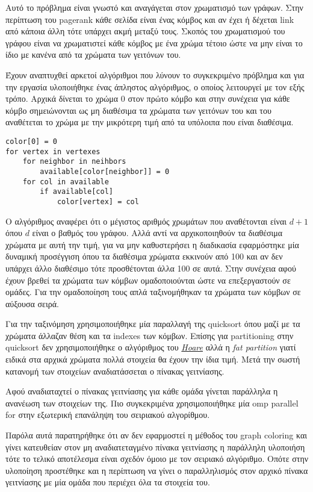 \documentclass[10p]{report}
\begin{document}
Αυτό το πρόβλημα είναι γνωστό και αναγάγεται στον χρωματισμό των γράφων. Στην
περίπτωση του pagerank κάθε σελίδα είναι ένας κόμβος και αν έχει ή δέχεται link
από κάποια άλλη τότε υπάρχει ακμή μεταξύ τους. Σκοπός του χρωματισμού του γράφου
είναι να χρωματιστεί κάθε κόμβος με ένα χρώμα τέτοιο ώστε να μην είναι το ίδιο
με κανένα από τα χρώματα των γειτόνων του. 

Έχουν αναπτυχθεί αρκετοί αλγόριθμοι που λύνουν το συγκεκριμένο πρόβλημα και για
την εργασία υλοποιήθηκε ένας άπληστος αλγόριθμος, ο οποίος λειτουργεί
με τον εξής τρόπο. Αρχικά δίνεται το χρώμα 0 στον πρώτο κόμβο και στην συνέχεια
για κάθε κόμβο σημειώνονται ως μη διαθέσιμα τα χρώματα των γειτόνων του και του
αναθέτεται το χρώμα με την μικρότερη τιμή από τα υπόλοιπα που είναι διαθέσιμα. 
\newpage
\begin{lstlisting}
color[0] = 0
for vertex in vertexes
    for neighbor in neihbors
        available[color[neighbor]] = 0
    for col in available
        if available[col]
            color[vertex] = col
\end{lstlisting}

Ο αλγόριθμος αναφέρει ότι ο μέγιστος αριθμός χρωμάτων που αναθέτονται είναι
$ d + 1 $ όπου $ d $ είναι ο βαθμός του γράφου. Αλλά αντί να αρχικοποιηθούν τα διαθέσιμα
χρώματα με αυτή την τιμή, για να μην καθυστερήσει η διαδικασία εφαρμόστηκε μία
δυναμική προσέγγιση όπου τα διαθέσιμα χρώματα εκκινούν από 100 και αν δεν
υπάρχει άλλο διαθέσιμο τότε προσθέτονται άλλα 100 σε αυτά.
Στην συνέχεια αφού έχουν βρεθεί τα χρώματα των κόμβων ομαδοποιούνται ώστε να
επεξεργαστούν σε ομάδες. Για την ομαδοποίηση τους απλά ταξινομήθηκαν τα χρώματα
των κόμβων σε αύξουσα σειρά.

Για την ταξινόμηση χρησιμοποιήθηκε μία παραλλαγή της quicksort όπου μαζί με τα
χρώματα άλλαζαν θέση και τα indexes των κόμβων. Επίσης για partitioning στην
quicksort δεν χρησιμοποιήθηκε ο αλγόριθμος του 
\href{https://en.wikipedia.org/wiki/Quicksort#Hoare_partition_scheme}{\textit{Hoare}}
αλλά η \textit{fat partition}
γιατί ειδικά στα αρχικά χρώματα πολλά στοιχεία θα έχουν την ίδια τιμή. Μετά την
σωστή κατανομή των στοιχείων αναδιατάσσεται ο πίνακας γειτνίασης. 

Αφού αναδιαταχτεί ο πίνακας γειτνίασης για κάθε ομάδα γίνεται παράλληλα η ανανέωση 
των στοιχείων της. Πιο συγκεκριμένα χρησιμοποιήθηκε μία omp parallel for στην εξωτερική 
επανάληψη του σειριακού αλγορίθμου.

Παρόλα αυτά παρατηρήθηκε ότι αν δεν εφαρμοστεί η μέθοδος του graph coloring και 
γίνει κατευθείαν στον μη αναδιατεταγμένο πίνακα γειτνίασης η παράλληλη υλοποιήση
τότε το τελικό αποτέλεσμα είναι σχεδόν όμοιο με τον σειριακό αλγόριθμο. Οπότε 
στην υλοποίηση προστέθηκε και η περίπτωση να γίνει ο παραλληλισμός στον αρχικό πίνακα 
γειτνίασης με μία ομάδα που περιέχει όλα τα στοιχεία του.
\end{document}
